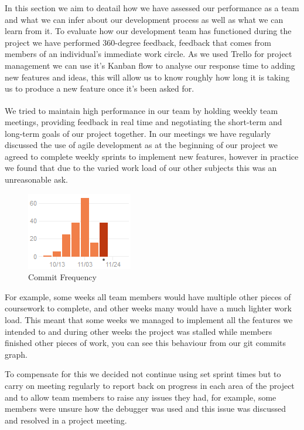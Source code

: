 \documentclass[10pt, a4paper]{article}
\begin{document}
In this section we aim to deatail how we have assessed our performance as a team and what we can infer about our development process as well as what we can learn from it. To evaluate how our development team has functioned during the project we have performed 360-degree feedback, feedback that comes from members of an individual’s immediate work circle. As we used Trello for project management we can use it’s Kanban flow to analyse our response time to adding new features and ideas, this will allow us to know roughly how long it is taking us to produce a new feature once it’s been asked for.

We tried to maintain high performance in our team\textsuperscript{\cite{semantia}} by holding weekly team meetings, providing feedback in real time and negotiating the short-term and long-term goals of our project together. In our meetings we have regularly discussed the use of agile development as at the beginning of our project we agreed to complete weekly sprints to implement new features, however in practice we found that due to the varied work load of our other subjects this was an unreasonable ask. 

\begin{figure}
        \centering
        \includegraphics{images/evaluation/commit_freq.png}
        \caption{Commit Frequency}
\end{figure}

For example, some weeks all team members would have multiple other pieces of coursework to complete, and other weeks many would have a much lighter work load. This meant that some weeks we managed to implement all the features we intended to and during other weeks the project was stalled while members finished other pieces of work, you can see this behaviour from our git commits graph.


To compensate for this we decided not continue using set sprint times but to carry on meeting regularly to report back on progress in each area of the project and to allow team members to raise any issues they had, for example, some members were unsure how the debugger was used and this issue was discussed and resolved in a project meeting.
\end{document}

